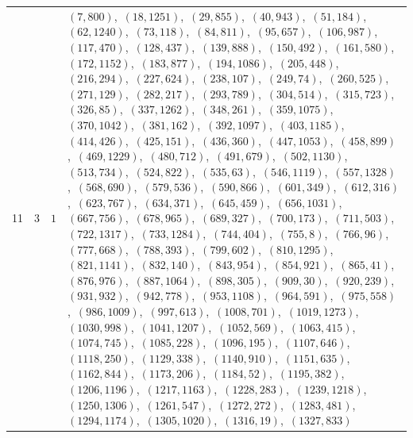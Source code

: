 \documentclass[11pt]{article}
\begin{document}
\begin{longtable}{@{}rrl>{\raggedright\arraybackslash}p{}@{}}
11 & 3 & $1$ & $(7,800)$,\allowbreak\ $(18,1251)$,\allowbreak\ $(29,855)$,\allowbreak\ $(40,943)$,\allowbreak\ $(51,184)$,\allowbreak\ $(62,1240)$,\allowbreak\ $(73,118)$,\allowbreak\ $(84,811)$,\allowbreak\ $(95,657)$,\allowbreak\ $(106,987)$,\allowbreak\ $(117,470)$,\allowbreak\ $(128,437)$,\allowbreak\ $(139,888)$,\allowbreak\ $(150,492)$,\allowbreak\ $(161,580)$,\allowbreak\ $(172,1152)$,\allowbreak\ $(183,877)$,\allowbreak\ $(194,1086)$,\allowbreak\ $(205,448)$,\allowbreak\ $(216,294)$,\allowbreak\ $(227,624)$,\allowbreak\ $(238,107)$,\allowbreak\ $(249,74)$,\allowbreak\ $(260,525)$,\allowbreak\ $(271,129)$,\allowbreak\ $(282,217)$,\allowbreak\ $(293,789)$,\allowbreak\ $(304,514)$,\allowbreak\ $(315,723)$,\allowbreak\ $(326,85)$,\allowbreak\ $(337,1262)$,\allowbreak\ $(348,261)$,\allowbreak\ $(359,1075)$,\allowbreak\ $(370,1042)$,\allowbreak\ $(381,162)$,\allowbreak\ $(392,1097)$,\allowbreak\ $(403,1185)$,\allowbreak\ $(414,426)$,\allowbreak\ $(425,151)$,\allowbreak\ $(436,360)$,\allowbreak\ $(447,1053)$,\allowbreak\ $(458,899)$,\allowbreak\ $(469,1229)$,\allowbreak\ $(480,712)$,\allowbreak\ $(491,679)$,\allowbreak\ $(502,1130)$,\allowbreak\ $(513,734)$,\allowbreak\ $(524,822)$,\allowbreak\ $(535,63)$,\allowbreak\ $(546,1119)$,\allowbreak\ $(557,1328)$,\allowbreak\ $(568,690)$,\allowbreak\ $(579,536)$,\allowbreak\ $(590,866)$,\allowbreak\ $(601,349)$,\allowbreak\ $(612,316)$,\allowbreak\ $(623,767)$,\allowbreak\ $(634,371)$,\allowbreak\ $(645,459)$,\allowbreak\ $(656,1031)$,\allowbreak\ $(667,756)$,\allowbreak\ $(678,965)$,\allowbreak\ $(689,327)$,\allowbreak\ $(700,173)$,\allowbreak\ $(711,503)$,\allowbreak\ $(722,1317)$,\allowbreak\ $(733,1284)$,\allowbreak\ $(744,404)$,\allowbreak\ $(755,8)$,\allowbreak\ $(766,96)$,\allowbreak\ $(777,668)$,\allowbreak\ $(788,393)$,\allowbreak\ $(799,602)$,\allowbreak\ $(810,1295)$,\allowbreak\ $(821,1141)$,\allowbreak\ $(832,140)$,\allowbreak\ $(843,954)$,\allowbreak\ $(854,921)$,\allowbreak\ $(865,41)$,\allowbreak\ $(876,976)$,\allowbreak\ $(887,1064)$,\allowbreak\ $(898,305)$,\allowbreak\ $(909,30)$,\allowbreak\ $(920,239)$,\allowbreak\ $(931,932)$,\allowbreak\ $(942,778)$,\allowbreak\ $(953,1108)$,\allowbreak\ $(964,591)$,\allowbreak\ $(975,558)$,\allowbreak\ $(986,1009)$,\allowbreak\ $(997,613)$,\allowbreak\ $(1008,701)$,\allowbreak\ $(1019,1273)$,\allowbreak\ $(1030,998)$,\allowbreak\ $(1041,1207)$,\allowbreak\ $(1052,569)$,\allowbreak\ $(1063,415)$,\allowbreak\ $(1074,745)$,\allowbreak\ $(1085,228)$,\allowbreak\ $(1096,195)$,\allowbreak\ $(1107,646)$,\allowbreak\ $(1118,250)$,\allowbreak\ $(1129,338)$,\allowbreak\ $(1140,910)$,\allowbreak\ $(1151,635)$,\allowbreak\ $(1162,844)$,\allowbreak\ $(1173,206)$,\allowbreak\ $(1184,52)$,\allowbreak\ $(1195,382)$,\allowbreak\ $(1206,1196)$,\allowbreak\ $(1217,1163)$,\allowbreak\ $(1228,283)$,\allowbreak\ $(1239,1218)$,\allowbreak\ $(1250,1306)$,\allowbreak\ $(1261,547)$,\allowbreak\ $(1272,272)$,\allowbreak\ $(1283,481)$,\allowbreak\ $(1294,1174)$,\allowbreak\ $(1305,1020)$,\allowbreak\ $(1316,19)$,\allowbreak\ $(1327,833)$\\

\end{longtable}
\end{document}
